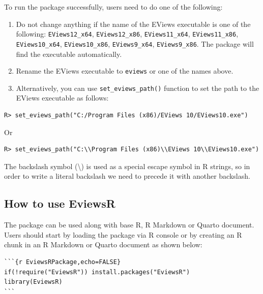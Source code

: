 To run the package successfully, users need to do one of the following:

\begin{enumerate}
\def\labelenumi{\arabic{enumi}.}
\item
  Do not change anything if the name of the EViews executable is one of the following: \texttt{EViews12\_x64}, \texttt{EViews12\_x86}, \texttt{EViews11\_x64}, \texttt{EViews11\_x86}, \texttt{EViews10\_x64}, \texttt{EViews10\_x86}, \texttt{EViews9\_x64}, \texttt{EViews9\_x86}. The package will find the executable automatically.
\item
  Rename the EViews executable to \texttt{eviews} or one of the names above.
\item
  Alternatively, you can use \texttt{set\_eviews\_path()} function to set the path to the EViews executable as follows:
\end{enumerate}

\begin{verbatim}
R> set_eviews_path("C:/Program Files (x86)/EViews 10/EViews10.exe")
\end{verbatim}

Or

\begin{verbatim}
R> set_eviews_path("C:\\Program Files (x86)\\EViews 10\\EViews10.exe")
\end{verbatim}

The backslash symbol (\textbackslash) is used as a special escape symbol in R strings, so in order to write a literal backslash we need to precede it with another backslash.

\hypertarget{sec-use}{%
\subsection{How to use EviewsR}\label{sec-use}}

The package  can be used along with base R, R Markdown or Quarto document. Users should start by loading the  package via R console or by creating an R chunk in an R Markdown or Quarto document as shown below:

\begin{verbatim}
```{r EviewsRPackage,echo=FALSE}                    
if(!require("EviewsR")) install.packages("EviewsR")    
library(EviewsR)
```
\end{verbatim}

